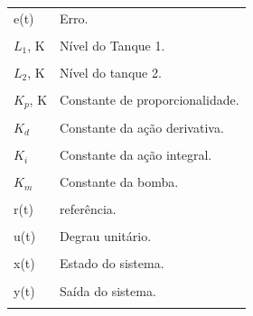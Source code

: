 \documentclass[a4paper,12pt]{article}
\begin{document}
\begin{tabular}{ l l }

e(t) \hspace{0.5cm} & Erro.\\
\phantom{a} & \phantom{a}\\
$L_1$, K \hspace{1.5cm} & Nível do Tanque 1.\\
\phantom{a} & \phantom{a}\\
$L_2$, K \hspace{1.5cm} & Nível do tanque 2.\\
\phantom{a} & \phantom{a}\\
$K_p$, K \hspace{1.5cm} & Constante de proporcionalidade.\\
\phantom{a} & \phantom{a}\\
$K_d$ \hspace{1.5cm} &     Constante da ação derivativa.\\
\phantom{a} & \phantom{a}\\
$K_i$ \hspace{1.5cm} & Constante da ação integral.\\
\phantom{a} & \phantom{a}\\
$K_m$ \hspace{0.5cm} & Constante da bomba.\\
\phantom{a} & \phantom{a}\\
r(t) \hspace{0.5cm} & referência.\\
\phantom{a} & \phantom{a}\\
u(t) \hspace{0.5cm} & Degrau unitário.\\
\phantom{a} & \phantom{a}\\
x(t) \hspace{0.5cm} & Estado do sistema.\\
\phantom{a} & \phantom{a}\\
y(t) \hspace{0.5cm} & Saída do sistema.\\
\phantom{a} & \phantom{a}\\

\end{tabular}



\newpage


\thispagestyle{empty}
\end{document}
